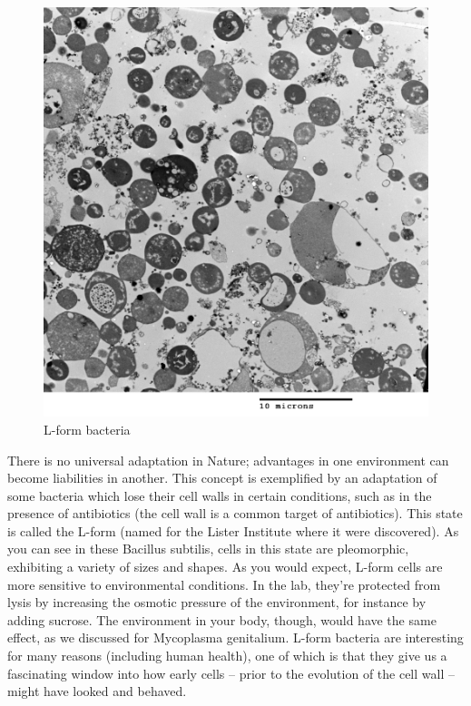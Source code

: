 \documentclass[]{tufte-book}
\begin{document}
\begin{figure}
\includegraphics{img/02_schematic/2_2_1_L_form_bacteria} \caption[L-form bacteria]{L-form bacteria}\label{fig:2-2-1}
\end{figure}

There is no universal adaptation in Nature; advantages in one
environment can become liabilities in another. This concept is
exemplified by an adaptation of some bacteria which lose their cell
walls in certain conditions, such as in the presence of antibiotics (the
cell wall is a common target of antibiotics). This state is called the
L-form (named for the Lister Institute where it were discovered). As you
can see in these Bacillus subtilis, cells in this state are pleomorphic,
exhibiting a variety of sizes and shapes. As you would expect, L-form
cells are more sensitive to environmental conditions. In the lab,
they're protected from lysis by increasing the osmotic pressure of the
environment, for instance by adding sucrose. The environment in your
body, though, would have the same effect, as we discussed for Mycoplasma
genitalium. L-form bacteria are interesting for many reasons (including
human health), one of which is that they give us a fascinating window
into how early cells -- prior to the evolution of the cell wall -- might
have looked and behaved.
\end{document}
